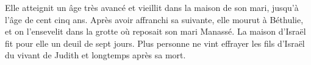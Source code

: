 Elle atteignit un âge très avancé et vieillit dans la maison de son mari,
	jusqu'à l'âge de cent cinq ans.
Après avoir affranchi sa suivante, elle mourut à Béthulie,
	et on l'ensevelit dans la grotte où reposait son mari Manassé.
La maison d'Israël fit pour elle un deuil de sept jours.
Plus personne ne vint effrayer les fils d'Israël du vivant de Judith
	et longtemps après sa mort.
